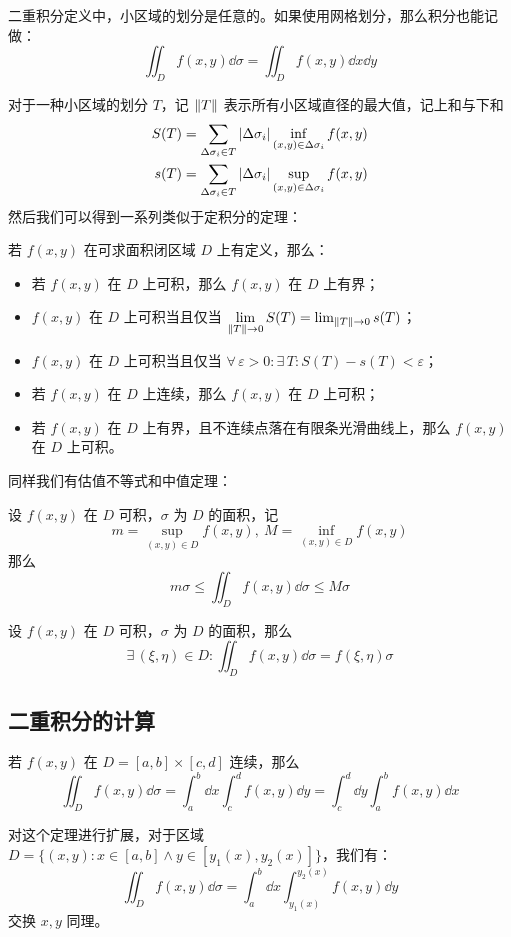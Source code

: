 \begin{remark}
	二重积分定义中，小区域的划分是任意的。如果使用网格划分，那么积分也能记做：
	$$
	\iint_D f(x, y) \dd{\sigma} = \iint_D f(x, y) \dd{x} \dd{y}
	$$
\end{remark}

对于一种小区域的划分 $T$，记 $\norm{T}$ 表示所有小区域直径的最大值，记上和与下和
$$
\begin{aligned}
	S(T) & = \sum_{\Delta \sigma_i \in T} \abs{\Delta \sigma_i} \inf_{(x, y) \in \Delta \sigma_i} f(x, y) \\
	s(T) & = \sum_{\Delta \sigma_i \in T} \abs{\Delta \sigma_i} \sup_{(x, y) \in \Delta \sigma_i} f(x, y) \\
\end{aligned}
$$
然后我们可以得到一系列类似于定积分的定理：

\begin{theorem}[二重积分存在定理]
	若 $f(x, y)$ 在可求面积闭区域 $D$ 上有定义，那么：
	\begin{itemize}
		\item 若 $f(x, y)$ 在 $D$ 上可积，那么 $f(x, y)$ 在 $D$ 上有界；
		\item $f(x, y)$ 在 $D$ 上可积当且仅当 $\lim\limits_{\norm{T} \to 0} S(T) = \lim_{\norm{T} \to 0} s(T)$；
		\item $f(x, y)$ 在 $D$ 上可积当且仅当 $\forall\,\varepsilon > 0: \exists\,T: S(T) - s(T) < \varepsilon$；
		\item 若 $f(x, y)$ 在 $D$ 上连续，那么 $f(x, y)$ 在 $D$ 上可积；
		\item 若 $f(x, y)$ 在 $D$ 上有界，且不连续点落在有限条光滑曲线上，那么 $f(x, y)$ 在 $D$ 上可积。
	\end{itemize}
\end{theorem}

同样我们有估值不等式和中值定理：

\begin{theorem}[二重积分估值不等式]
	设 $f(x, y)$ 在 $D$ 可积，$\sigma$ 为 $D$ 的面积，记
	$$
	m = \sup_{(x, y) \in D} f(x, y),\ M = \inf_{(x, y) \in D} f(x, y)
	$$
	那么
	$$
	m \sigma \le \iint_D f(x, y) \dd{\sigma} \le M \sigma
	$$
\end{theorem}

\begin{theorem}[二重积分中值定理]
	设 $f(x, y)$ 在 $D$ 可积，$\sigma$ 为 $D$ 的面积，那么
	$$
	\exists\,(\xi, \eta) \in D: \iint_D f(x, y) \dd{\sigma} = f(\xi, \eta) \sigma
	$$
\end{theorem}

\subsection{二重积分的计算}

\begin{theorem}
	若 $f(x, y)$ 在 $D = [a, b] \times [c, d]$ 连续，那么
	$$
	\iint_D f(x, y) \dd{\sigma} = \int_{a}^{b} \dd{x} \int_{c}^{d} f(x, y) \dd{y} = \int_{c}^{d} \dd{y} \int_{a}^{b} f(x, y) \dd{x}
	$$
\end{theorem}

对这个定理进行扩展，对于区域 $D = \{(x, y): x \in [a, b] \land y \in [y_1(x), y_2(x)]\}$，我们有：
$$
\iint_D f(x, y) \dd{\sigma} = \int_{a}^{b} \dd{x} \int_{y_1(x)}^{y_2(x)} f(x, y) \dd{y}
$$
交换 $x, y$ 同理。